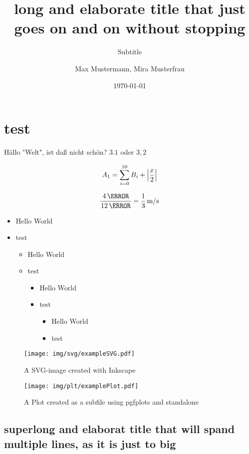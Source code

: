 \documentclass[todos=off]{HsH-report}
\author{
	Max Mustermann,
	Mira Musterfrau
}
\title{long and elaborate title that just goes on and on without stopping}
\subtitle{Subtitle}
\date{\today}
\begin{document}
	\frontmatter
	\maketitle

	\declarationofauthorship

	\begin{abstract}
		\lipsum[3-5]
	\end{abstract}

	\tableofcontents
	\mainmatter

	\chapter{test}

		Hällo "Welt", ist daß nicht schön? $3.1$ oder $3,2$

		\begin{equation}
			A_1 = \sum_{i=0}^{10} B_i + \left\vert\frac{x}{2}\right\vert
		\end{equation}

		\begin{equation}
			\frac{4\,\m}{12\,\s} = \frac{1}{3}\,\unit{m\per s}
		\end{equation}


		\begin{itemize}
			\item Hello World
			\item test
			\begin{itemize}
				\item Hello World
				\item test
				\begin{itemize}
					\item Hello World
					\item test
					\begin{itemize}
						\item Hello World
						\item test
					\end{itemize}
				\end{itemize}
			\end{itemize}
		\end{itemize}

		\begin{figure}
			\texttt{[image: img/svg/exampleSVG.pdf]}
			\caption{A SVG-image created with Inkscape}
		\end{figure}

		\begin{figure}
			\texttt{[image: img/plt/examplePlot.pdf]}
			\caption{A Plot created as a subfile using pgfplots and standalone}
		\end{figure}

	\section{superlong and elaborat title that will spand multiple lines, as it is just to big}
		\lipsum[12-13]
		\smallskip

		\lipsum[12-13]


		\lipsum[12-13]
\end{document}
